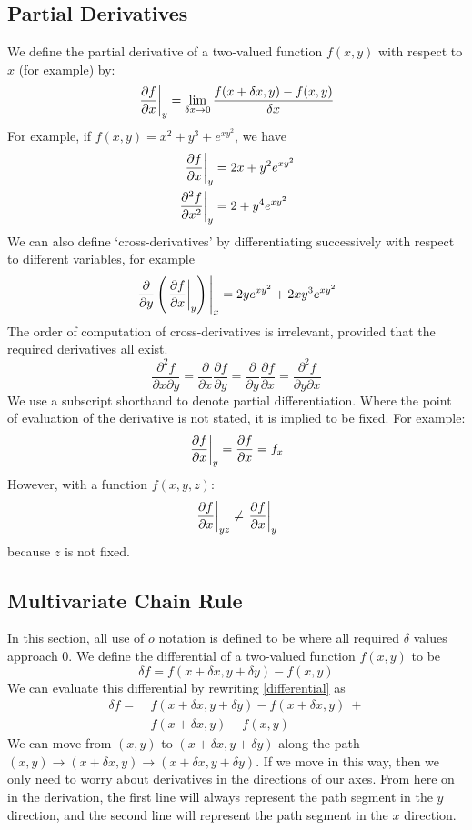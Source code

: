 \documentclass{article}
\begin{document}
	\subsection{Partial Derivatives}
	We define the partial derivative of a two-valued function $f(x, y)$ with respect to $x$ (for example) by:
	\begin{equation}
		\eval{\frac{\partial f}{\partial x}}_{y} = \lim_{\delta x\to 0} \frac{f(x + \delta x, y) - f(x, y)}{\delta x}
	\end{equation}
	For example, if $f(x,y) = x^2 + y^3 + e^{xy^2}$, we have
	\begin{align*}
		\eval{\frac{\partial f}{\partial x}}_{y} &= 2x + y^2 e^{xy^2} \\
		\eval{\frac{\partial^2 f}{\partial x^2}}_{y} &= 2 + y^4 e^{xy^2}
	\end{align*}
	We can also define `cross-derivatives' by differentiating successively with respect to different variables, for example
	\[ \eval{\frac{\partial}{\partial y} \left( \eval{\frac{\partial f}{\partial x}}_{y} \right)}_{x} = 2ye^{xy^2} + 2xy^3e^{xy^2} \]
	The order of computation of cross-derivatives is irrelevant, provided that the required derivatives all exist.
	\begin{equation}
		\frac{\partial^2 f}{\partial x \partial y} = \frac{\partial}{\partial x}\frac{\partial f}{\partial y} = \frac{\partial}{\partial y}\frac{\partial f}{\partial x} = \frac{\partial^2 f}{\partial y \partial x}
	\end{equation}
	We use a subscript shorthand to denote partial differentiation. Where the point of evaluation of the derivative is not stated, it is implied to be fixed. For example:
	\[ \eval{\frac{\partial f}{\partial x}}_{y} = \frac{\partial f}{\partial x} = f_x \]
	However, with a function $f(x, y, z)$:
	\[ \eval{\frac{\partial f}{\partial x}}_{yz} \neq \eval{\frac{\partial f}{\partial x}}_{y} \]
	because $z$ is not fixed.
	
	\subsection{Multivariate Chain Rule}
	In this section, all use of $o$ notation is defined to be where all required $\delta$ values approach 0. We define the differential of a two-valued function $f(x, y)$ to be
	\begin{equation}\label{differential}
		\delta f = f(x + \delta x, y + \delta y) - f(x, y)
	\end{equation}
	We can evaluate this differential by rewriting \eqref{differential} as
	\begin{align*}
		\delta f =\ &f(x + \delta x, y + \delta y) - f(x + \delta x, y)\ + \\
		&f(x + \delta x, y) - f(x, y)
	\end{align*}
	We can move from $(x, y)$ to $(x + \delta x, y + \delta y)$ along the path $(x, y) \to (x + \delta x, y) \to (x + \delta x, y + \delta y)$. If we move in this way, then we only need to worry about derivatives in the directions of our axes. From here on in the derivation, the first line will always represent the path segment in the $y$ direction, and the second line will represent the path segment in the $x$ direction.
	
\end{document}
